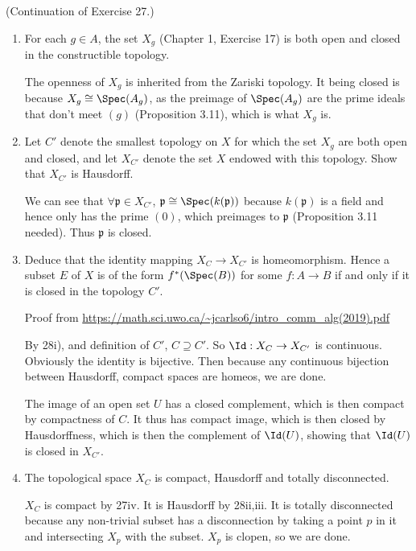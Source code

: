 \begin{questions}
\question (Continuation of Exercise 27.)
\begin{enumerate}
\item For each $g \in A $, the set $X_g $ (Chapter 1, Exercise 17) is both open and closed in the constructible topology.
\begin{solution}
	The openness of $X_g $ is inherited from the Zariski topology.
	It being closed is because $X_g \cong \Spec(A_g) $, as the preimage of $\Spec(A_g) $ are the prime ideals that don't meet $(g) $ (Proposition 3.11), which is what $X_g$ is.
\end{solution}
\item Let $C' $ denote the smallest topology on $X $ for which the set $X_g $ are both open and closed, and let $X_{C'} $ denote the set $X $ endowed with this topology. Show that $X_{C'} $ is Hausdorff.
\begin{solution}
	We can see that $\forall \mathfrak{p} \in X_{C'} $, $\mathfrak{p} \cong \Spec(k(\mathfrak{p})) $ because $k(\mathfrak{p}) $ is a field and hence only has the prime $(0) $, which preimages to $\mathfrak{p} $ (Proposition 3.11 needed).
	Thus $\mathfrak{p} $ is closed.
\end{solution}
\item Deduce that the identity mapping $X_C \to X_{C'} $ is homeomorphism. Hence a subset $E $ of $X $ is of the form $f^\ast(\Spec(B)) $ for some $f: A\to B $ if and only if it is closed in the topology $C' $.
\begin{solution}
	Proof from \url{https://math.sci.uwo.ca/~jcarlso6/intro_comm_alg(2019).pdf}

	By 28i), and definition of $C' $, $C \supseteq C' $.
	So $\Id:X_C\to X_{C'} $ is continuous.
	Obviously the identity is bijective.
	Then because any continuous bijection between Hausdorff, compact spaces are homeos, we are done.

	The image of an open set $U $ has a closed complement, which is then compact by compactness of $C $.
	It thus has compact image, which is then closed by Hausdorffness, which is then the complement of $\Id(U) $, showing that $\Id(U) $ is closed in $X_{C'} $.
\end{solution}
\item The topological space $X_C $ is compact, Hausdorff and totally disconnected.
\begin{solution}
	$X_C $ is compact by 27iv.
	It is Hausdorff by 28ii,iii.
	It is totally disconnected because any non-trivial subset has a disconnection by taking a point $p $ in it and intersecting $X_p $ with the subset.
	$X_p $ is clopen, so we are done.
\end{solution}
\end{enumerate}


\end{questions}
